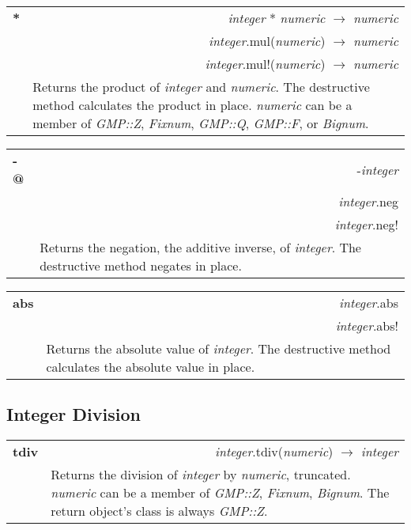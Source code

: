 \documentclass[pdftex,10pt]{article}
\newlength{\methwidth}
\newlength{\defnwidth}
\begin{document}
\begin{tabular}{p{\methwidth} l r}
\toprule
\textbf{*} & & \textit{integer} * \textit{numeric} $\rightarrow$ \textit{numeric} \\
& & \textit{integer}.mul(\textit{numeric}) $\rightarrow$ \textit{numeric} \\
& & \textit{integer}.mul!(\textit{numeric}) $\rightarrow$ \textit{numeric} \\
\cmidrule(r){2-3}
& \multicolumn{2}{p{\defnwidth}}{
  Returns the product of \textit{integer} and \textit{numeric}. The destructive method
  calculates the product in place. \textit{numeric} can be a member of \textit{GMP::Z},
  \textit{Fixnum}, \textit{GMP::Q}, \textit{GMP::F}, or \textit{Bignum}.
}
\end{tabular}
\newline\newline

\begin{tabular}{p{\methwidth} l r}
\toprule
\textbf{-@} & & -\textit{integer}\\
& & \textit{integer}.neg\\
& & \textit{integer}.neg!\\
\cmidrule(r){2-3}
& \multicolumn{2}{p{\defnwidth}}{
  Returns the negation, the additive inverse, of \textit{integer}. The destructive method
  negates in place.
}
\end{tabular}
\newline\newline

\begin{tabular}{p{\methwidth} l r}
\toprule
\textbf{abs} & & \textit{integer}.abs\\
& & \textit{integer}.abs!\\
\cmidrule(r){2-3}
& \multicolumn{2}{p{\defnwidth}}{
  Returns the absolute value of \textit{integer}. The destructive method calculates the
  absolute value in place.
}
\end{tabular}

\subsection{Integer Division}

\begin{tabular}{p{\methwidth} l r}
\toprule
\textbf{tdiv} & & \textit{integer}.tdiv(\textit{numeric}) $\rightarrow$ \textit{integer}\\
\cmidrule(r){2-3}
& \multicolumn{2}{p{\defnwidth}}{
  Returns the division of \textit{integer} by \textit{numeric}, truncated.
  \textit{numeric} can be a member of \textit{GMP::Z}, \textit{Fixnum}, \textit{Bignum}.
  The return object's class is always \textit{GMP::Z}.
}
\end{tabular}
\newline\newline
\end{document}

